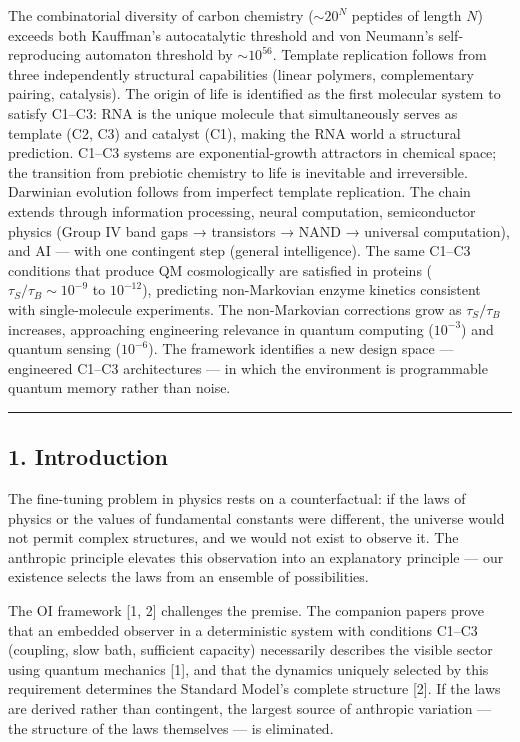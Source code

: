 \documentclass[
]{article}
\begin{document}
The combinatorial diversity of carbon chemistry (\(\sim 20^N\) peptides
of length \(N\)) exceeds both Kauffman's autocatalytic threshold and von
Neumann's self-reproducing automaton threshold by \(\sim 10^{56}\).
Template replication follows from three independently structural
capabilities (linear polymers, complementary pairing, catalysis). The
origin of life is identified as the first molecular system to satisfy
C1--C3: RNA is the unique molecule that simultaneously serves as
template (C2, C3) and catalyst (C1), making the RNA world a structural
prediction. C1--C3 systems are exponential-growth attractors in chemical
space; the transition from prebiotic chemistry to life is inevitable and
irreversible. Darwinian evolution follows from imperfect template
replication. The chain extends through information processing, neural
computation, semiconductor physics (Group IV band gaps → transistors →
NAND → universal computation), and AI --- with one contingent step
(general intelligence). The same C1--C3 conditions that produce QM
cosmologically are satisfied in proteins
(\(\tau_S / \tau_B \sim 10^{-9}\) to \(10^{-12}\)), predicting
non-Markovian enzyme kinetics consistent with single-molecule
experiments. The non-Markovian corrections grow as \(\tau_S / \tau_B\)
increases, approaching engineering relevance in quantum computing
(\(10^{-3}\)) and quantum sensing (\(10^{-6}\)). The framework
identifies a new design space --- engineered C1--C3 architectures --- in
which the environment is programmable quantum memory rather than noise.

\begin{center}\rule{0.5\linewidth}{0.5pt}\end{center}

\hypertarget{introduction}{%
\subsection{1. Introduction}\label{introduction}}

The fine-tuning problem in physics rests on a counterfactual: if the
laws of physics or the values of fundamental constants were different,
the universe would not permit complex structures, and we would not exist
to observe it. The anthropic principle elevates this observation into an
explanatory principle --- our existence selects the laws from an
ensemble of possibilities.

The OI framework {[}1, 2{]} challenges the premise. The companion papers
prove that an embedded observer in a deterministic system with
conditions C1--C3 (coupling, slow bath, sufficient capacity) necessarily
describes the visible sector using quantum mechanics {[}1{]}, and that
the dynamics uniquely selected by this requirement determines the
Standard Model's complete structure {[}2{]}. If the laws are derived
rather than contingent, the largest source of anthropic variation ---
the structure of the laws themselves --- is eliminated.
\end{document}
